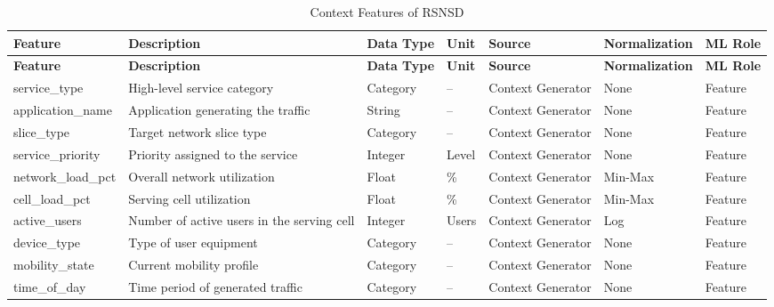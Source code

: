 \documentclass[12pt,a4paper]{article}
\begin{document}
\begin{longtable}{p{3cm}p{5cm}p{2cm}p{1.5cm}p{2.3cm}p{2cm}p{2cm}}
	\caption{Context Features of RSNSD}
	\label{tab:context_features}\\
	
	\toprule
	\textbf{Feature} & \textbf{Description} & \textbf{Data Type} & \textbf{Unit} & \textbf{Source} & \textbf{Normalization} & \textbf{ML Role}\\
	\midrule
	\endfirsthead
	
	\toprule
	\textbf{Feature} & \textbf{Description} & \textbf{Data Type} & \textbf{Unit} & \textbf{Source} & \textbf{Normalization} & \textbf{ML Role}\\
	\midrule
	\endhead
	
	service\_type &
	High-level service category &
	Category &
	-- &
	Context Generator &
	None &
	Feature \\
	
	application\_name &
	Application generating the traffic &
	String &
	-- &
	Context Generator &
	None &
	Feature \\
	
	slice\_type &
	Target network slice type &
	Category &
	-- &
	Context Generator &
	None &
	Feature \\
	
	service\_priority &
	Priority assigned to the service &
	Integer &
	Level &
	Context Generator &
	None &
	Feature \\
	
	network\_load\_pct &
	Overall network utilization &
	Float &
	\% &
	Context Generator &
	Min-Max &
	Feature \\
	
	cell\_load\_pct &
	Serving cell utilization &
	Float &
	\% &
	Context Generator &
	Min-Max &
	Feature \\
	
	active\_users &
	Number of active users in the serving cell &
	Integer &
	Users &
	Context Generator &
	Log &
	Feature \\
	
	device\_type &
	Type of user equipment &
	Category &
	-- &
	Context Generator &
	None &
	Feature \\
	
	mobility\_state &
	Current mobility profile &
	Category &
	-- &
	Context Generator &
	None &
	Feature \\
	
	time\_of\_day &
	Time period of generated traffic &
	Category &
	-- &
	Context Generator &
	None &
	Feature \\
	

\end{longtable}
\end{document}
